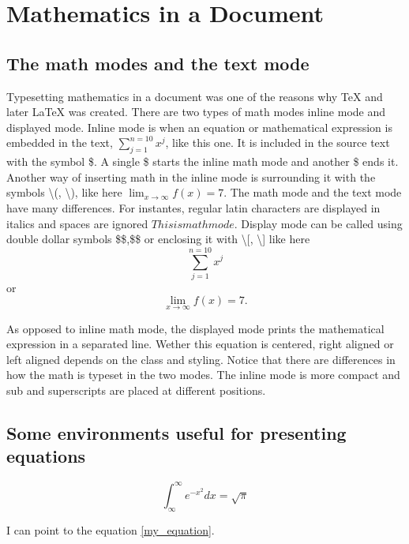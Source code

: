 \documentclass[a4paper]{article}
\begin{document}

\section{Mathematics in a Document}

\subsection{The math modes and the text mode}

Typesetting mathematics in a document was one of the reasons why \TeX{} and later \LaTeX{} was created. There are two types of math modes inline mode and displayed mode. Inline mode is when an equation or mathematical expression is embedded in the text, $\sum_{j=1}^{n=10}x^j$, like this one. It is included in the source text with the symbol \$. A single \$ starts the inline math mode and another \$ ends it. Another way of inserting math in the inline mode is surrounding it with the symbols \textbackslash(, \textbackslash), like here  \(\lim_{x\to\infty} f(x) = 7\). The math mode and the text mode have many differences. For instantes, regular latin characters are displayed in italics and spaces are ignored $This is math mode$. Display mode can be called using double dollar symbols \$\$,\$\$ or enclosing it with \textbackslash[, \textbackslash] like here $$\sum_{j=1}^{n=10}x^j$$ or \[\lim_{x\to\infty} f(x) = 7.\]

As opposed to inline math mode, the displayed mode prints the mathematical expression in a separated line. Wether this equation is centered, right aligned or left aligned depends on the class and styling. Notice that there are differences in how the math is typeset in the two modes. The inline mode is more compact and sub and superscripts are placed at different positions.

\subsection{Some environments useful for presenting equations}

  \begin{equation}\label{my_equation}
    \int_{\infty}^\infty e^{-x^2} dx = \sqrt{\pi}
  \end{equation}

I can point to the equation \ref{my_equation}. 

\end{document}

